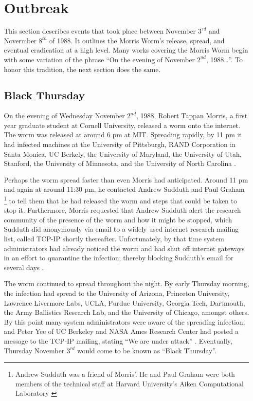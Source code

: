 \section*{Outbreak}
This section describes events that took place between November $3^{rd}$ and
Novermber $8^{th}$ of 1988. It outlines the Morris Worm's release, spread, and
eventual eradication at a high level.
Many works covering the Morris Worm begin with some variation of the phrase
``On the evening of November $2^{nd}$, 1988\ldots''.
To honor this tradition, the next section does the same. 

\subsection*{Black Thursday}

On the evening of Wednesday November $2^{nd}$, 1988, Robert Tappan Morris, a
first year graduate student at Cornell University, released a worm onto the
internet. The worm was released at around 6 pm at MIT. Spreading rapidly, by 11
pm it had infected machines at
the University of Pittsburgh,
RAND Corporation in Santa Monica,
UC Berkely,
the University of Maryland,
the University of Utah,
Stanford,
the University of Minnesota,
and the University of North Carolina
\cite{seeley_tour_1989,
spafford_internet_1989-1}.

Perhaps the worm spread faster than even Morris had anticipated. Around
11 pm and again at around 11:30 pm, he contacted Andrew Sudduth and Paul Graham
\footnote{
Andrew Sudduth was a friend of Morris'. He and Paul Graham were both
members of the technical staff at Harvard University's Aiken Computational
Laboratory \cite{lee_washpost_2013}
}
to tell them that he had released the worm and steps that could be taken to stop
it. Furthermore, Morris requested that Andrew Sudduth alert the research
community of the presence of the worm and how it might be stopped, which
Sudduth did anonymously via email to a widely used internet research mailing
list, called TCP-IP shortly thereafter.
Unfortunately, by that time system administrators had already noticed the worm and had shut off
internet gateways in an effort to quarantine the infection; thereby blocking
Sudduth's email for several days
\cite{lee_washpost_2013}\cite{eisenberg_cornell_1989}.

The worm continued to spread throughout the night. By early Thursday morning,
the infection had spread to the University of Arizona, Princeton University,
Lawrence Livermore Labs, UCLA, Purdue University, Georgia Tech, Dartmouth,
the Army Ballistics Research Lab, and the University of Chicago, amongst others.
By this point many system administrators were aware of the spreading infection, and Peter Yee of UC Berkeley and NASA
Ames Research Center had posted a message to the TCP-IP mailing, stating ``We
are under attack''\cite{seeley_tour_1989}
\cite{spafford_internet_1989-1}. Eventually, Thursday November $3^{rd}$ would
come to be known as ``Black Thursday''. 

